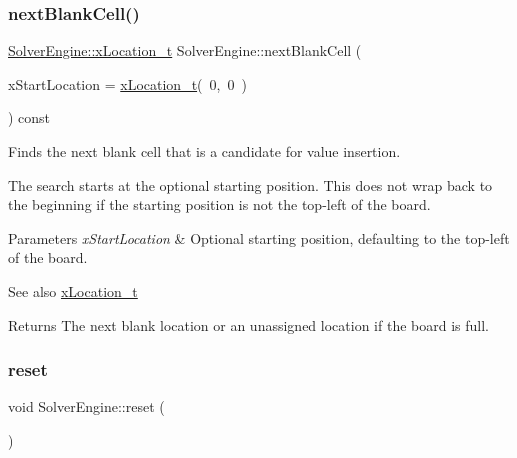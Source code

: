 \subsubsection{\texorpdfstring{next\+Blank\+Cell()}{nextBlankCell()}}
{\footnotesize\ttfamily \mbox{\hyperlink{struct_solver_engine_1_1x_location__t}{Solver\+Engine\+::x\+Location\+\_\+t}} Solver\+Engine\+::next\+Blank\+Cell (\begin{DoxyParamCaption}\item[{const \mbox{\hyperlink{struct_solver_engine_1_1x_location__t}{x\+Location\+\_\+t}} \&}]{x\+Start\+Location = {\ttfamily \mbox{\hyperlink{struct_solver_engine_1_1x_location__t}{x\+Location\+\_\+t}}(~0,~0~)} }\end{DoxyParamCaption}) const\hspace{0.3cm}{\ttfamily [private]}}



Finds the next blank cell that is a candidate for value insertion. 

The search starts at the optional starting position. This does not wrap back to the beginning if the starting position is not the top-\/left of the board. 
\begin{DoxyParams}{Parameters}
{\em x\+Start\+Location} & Optional starting position, defaulting to the top-\/left of the board. \\
\hline
\end{DoxyParams}
\begin{DoxySeeAlso}{See also}
\mbox{\hyperlink{struct_solver_engine_1_1x_location__t}{x\+Location\+\_\+t}} 
\end{DoxySeeAlso}
\begin{DoxyReturn}{Returns}
The next blank location or an unassigned location if the board is full. 
\end{DoxyReturn}
\mbox{\label{class_solver_engine_af8e6ec12a994e8a463f2b3b1a0368e33}} 
\subsubsection{\texorpdfstring{reset}{reset}}
{\footnotesize\ttfamily void Solver\+Engine\+::reset (\begin{DoxyParamCaption}{ }\end{DoxyParamCaption})\hspace{0.3cm}{\ttfamily [slot]}}



